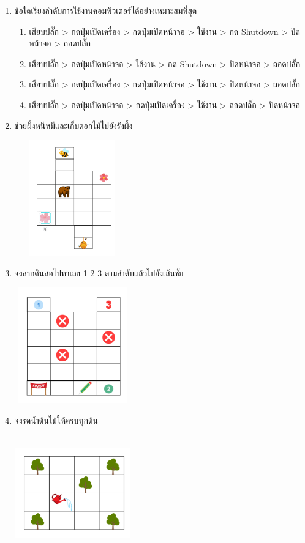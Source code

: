 \begin{enumerate}
    \item ข้อใดเรียงลำดับการใช้งานคอมพิวเตอร์ได้อย่างเหมาะสมที่สุด
    \begin{enumerate}
        \item เสียบปลั๊ก > กดปุ่มเปิดเครื่อง > กดปุ่มเปิดหน้าจอ > ใช้งาน > กด Shutdown > ปิดหน้าจอ > ถอดปลั๊ก
        \item เสียบปลั๊ก > กดปุ่มเปิดหน้าจอ > ใช้งาน > กด Shutdown > ปิดหน้าจอ > ถอดปลั๊ก
        \item เสียบปลั๊ก > กดปุ่มเปิดเครื่อง > กดปุ่มเปิดหน้าจอ > ใช้งาน > ปิดหน้าจอ > ถอดปลั๊ก
        \item เสียบปลั๊ก > กดปุ่มเปิดหน้าจอ > กดปุ่มเปิดเครื่อง > ใช้งาน > ถอดปลั๊ก > ปิดหน้าจอ
    \end{enumerate}
    \item ช่วยผึ้งหนีหมีและเก็บดอกไม้ไปยังรังผึ้ง
    \begin{center}
        \includegraphics[width=5cm, height=5cm]{pic-toro/exam/bee.png}
    \end{center}
    \item จงลากดินสอไปหาเลข 1 2 3 ตามลำดับแล้วไปยังเส้นชัย
    \begin{center}
        \includegraphics[width=5cm, height=5cm]{pic-toro/exam/pen.png}
    \end{center}
    \item จงรดน้ำต้นไม้ให้ครบทุกต้น
    \begin{center}
        \includegraphics[width=5cm, height=5cm]{pic-toro/exam/treeeasy.png}

\end{center}
\end{enumerate}
